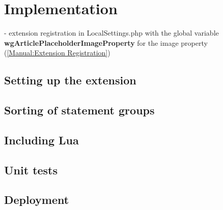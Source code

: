 	\section{Implementation}
	
	- extension registration in LocalSettings.php with the global variable \textbf{wgArticlePlaceholderImageProperty} for the image property (\href{https://www.mediawiki.org/wiki/Manual:Extension_registration}{[Manual:Extension Registration]})\\
	\subsection{Setting up the extension}
	
	
	
	\subsection{Sorting of statement groups}
	
	\subsection{Including Lua}
	\subsection{Unit tests}
	\subsection{Deployment}
	